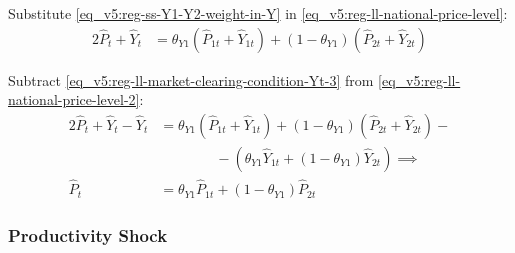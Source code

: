 \documentclass[../thesis.tex]{subfiles}
\begin{document}
	\begin{comment}
		Define the regional weights $\langle \begin{smallmatrix} \theta_{PY1} & (1-\theta_{PY1}) \end{smallmatrix} \rangle$ in the gross domestic production:
		\begin{align}
			\left\langle \begin{matrix} \theta_{PY1} & (1-\theta_{PY1}) \end{matrix} \right\rangle \coloneq \left\langle \begin{matrix} \frac{P_{1} Y_{1}}{P Y} & \frac{P_{2} Y_{2}}{PY} \end{matrix} \right\rangle \label{eq_v5:reg-ss-PYn-weight-in-PY}
		\end{align}
		
		Substitute \ref{eq_v5:reg-ss-PYn-weight-in-PY} in \ref{eq_v5:reg-ll-national-price-level}:
		
	\end{comment}


Substitute \ref{eq_v5:reg-ss-Y1-Y2-weight-in-Y} in \ref{eq_v5:reg-ll-national-price-level}:
\begin{alignat}{2}
	\hat{P}_{t} + \hat{Y}_{t} &= \theta_{Y1} (\hat{P}_{1t} + \hat{Y}_{1t}) + (1-\theta_{Y1}) (\hat{P}_{2t} + \hat{Y}_{2t})  \label{eq_v5:reg-ll-national-price-level-2}
\end{alignat}

Subtract \ref{eq_v5:reg-ll-market-clearing-condition-Yt-3} from \ref{eq_v5:reg-ll-national-price-level-2}:
\begin{alignat}{2}
	\hat{P}_{t} + \hat{Y}_{t} - \hat{Y}_{t} &= \theta_{Y1} (\hat{P}_{1t} + \hat{Y}_{1t}) + (1-\theta_{Y1}) (\hat{P}_{2t} + \hat{Y}_{2t}) - \nonumber \\ & \qquad \qquad - (\theta_{Y1} \hat{Y}_{1t} + (1-\theta_{Y1}) \hat{Y}_{2t}) \implies \nonumber \\
	\hat{P}_{t} &= \theta_{Y1} \hat{P}_{1t} + (1-\theta_{Y1}) \hat{P}_{2t} \label{eq_v5:reg-ll-national-price-level-3}
\end{alignat}


\subsubsection*{Productivity Shock}
\end{document}
